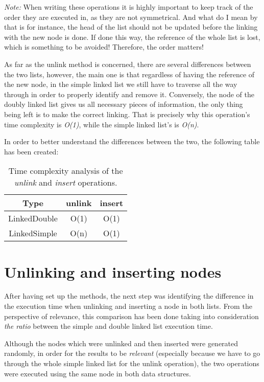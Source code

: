 \documentclass[a4paper,11pt]{article}
\begin{document}
\textit{Note: }When writing these operations it is highly important to keep track of the order they are executed in, as they are not symmetrical.
And what do I mean by that is for instance, the head of the list
should not be updated before the linking with the new node is done. If done this way, the reference of the whole list is lost, which is something to be 
avoided! Therefore, the order matters! \newline

As far as the unlink method is concerned, there are several differences between the two lists, however, the main one is that regardless of having the reference
of the new node, in the simple linked list we still have to traverse all the way through in order to properly identify and remove it. Conversely, the node
of the doubly linked list gives us all necessary pieces of information, the only thing being left is to make the correct linking.
That is precisely why this operation's time complexity is \textit{O(1)}, while the simple linked list's is \textit{O(n)}. \newline

In order to better understand the differences between the two, the following table has been created:

\begin{table}[h!]
    \centering
    \begin{tabular}{||c c c||} 
    \hline
    Type & unlink & insert\\ [0.5ex]
    \hline
    LinkedDouble& O(1) & O(1) \\
    LinkedSimple & O(n) & O(1) \\ [1ex] 
    \hline
    \end{tabular}
    \caption{Time complexity analysis of the \textit{unlink} and \textit{insert} operations.} 
    \label{table:1}
\end{table}


\section*{Unlinking and inserting nodes}

After having set up the methods, the next step was identifying the difference in the execution time when unlinking and inserting a node 
in both lists. From the perspective of relevance, this comparison has been done taking into consideration \textit{the ratio} between the simple 
and double linked list execution time. 

Although the nodes which were unlinked and then inserted were generated randomly,
in order for the results to be \textit{relevant} (especially because we have to go through the whole simple linked list for the unlink operation),
the two operations were executed using the same node in both data structures. \newline
\end{document}
